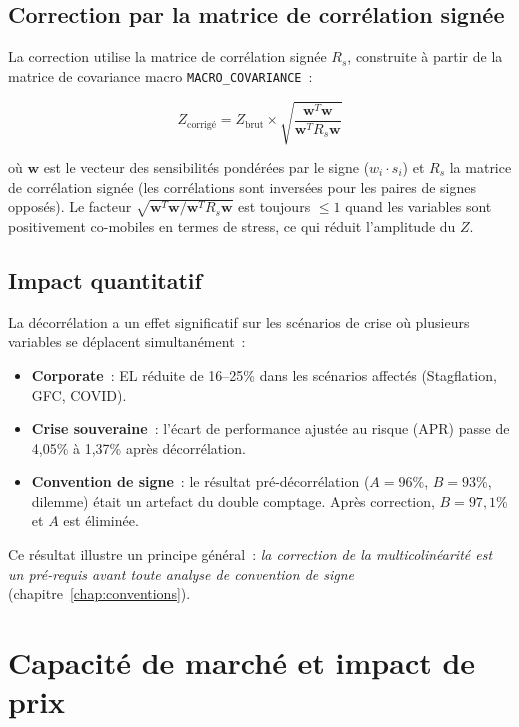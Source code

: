 \documentclass[12pt, a4paper, twoside, openright]{report}
\theoremstyle{definition}
\begin{document}
\subsection{Correction par la matrice de corrélation signée}

La correction utilise la matrice de corrélation signée $R_s$, construite à partir de la matrice de covariance macro \texttt{MACRO\_COVARIANCE}~:

\begin{equation}
Z_{\text{corrigé}} = Z_{\text{brut}} \times \sqrt{\frac{\mathbf{w}^T \mathbf{w}}{\mathbf{w}^T R_s \mathbf{w}}}
\label{eq:decorrelation}
\end{equation}

\noindent où $\mathbf{w}$ est le vecteur des sensibilités pondérées par le signe ($w_i \cdot s_i$) et $R_s$ la matrice de corrélation signée (les corrélations sont inversées pour les paires de signes opposés). Le facteur $\sqrt{\mathbf{w}^T \mathbf{w} / \mathbf{w}^T R_s \mathbf{w}}$ est toujours $\leq 1$ quand les variables sont positivement co-mobiles en termes de stress, ce qui réduit l'amplitude du $Z$.

\subsection{Impact quantitatif}

La décorrélation a un effet significatif sur les scénarios de crise où plusieurs variables se déplacent simultanément~:

\begin{itemize}
\item \textbf{Corporate}~: EL réduite de 16--25\% dans les scénarios affectés (Stagflation, GFC, COVID).
\item \textbf{Crise souveraine}~: l'écart de performance ajustée au risque (APR) passe de 4,05\% à 1,37\% après décorrélation.
\item \textbf{Convention de signe}~: le résultat pré-décorrélation ($A = 96\%$, $B = 93\%$, dilemme) était un artefact du double comptage. Après correction, $B = 97{,}1\%$ et $A$ est éliminée.
\end{itemize}

Ce résultat illustre un principe général~: \emph{la correction de la multicolinéarité est un pré-requis avant toute analyse de convention de signe} (chapitre~\ref{chap:conventions}).


\section{Capacité de marché et impact de prix}
\label{sec:multi-market-cap}
\end{document}
